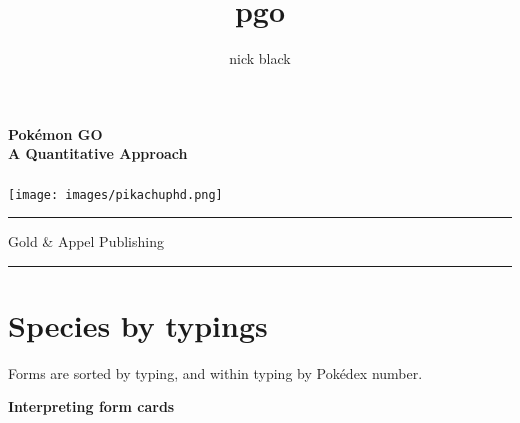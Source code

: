 \documentclass[ebook,10pt,openany,oneside]{memoir}
\title{pgo}
\author{nick black}
\def\LOGO {
  \textbf{
    \Huge Pokémon GO\\
    \Large A Quantitative Approach\\
  }}
\begin{document}
  \pagestyle{empty}
  \begin{center}
  \LOGO
  \bigskip
  \\
  \vspace{3cm}
  \texttt{[image: images/pikachuphd.png]}
  \end{center}
  \vfill\hrule
  \begin{center}\textsf{Gold \& Appel Publishing}\end{center}
  \hrule
  \clearpage
  \setcounter{page}{1}
  \pagestyle{plain} %

\clearpage
\ifdefined\epub
\else
  \hypertarget{toc}{}%
  \tableofcontents*
  \hypertarget{lot}{}%
  \listoftables*
  \hypertarget{lof}{}%
  \listoffigures*
  \fi

\mainmatter















\appendix

\chapter{Species by typings\label{chap:speciesbytype}}
Forms are sorted by typing, and within typing by Pokédex number.
\vfill
\begin{center}\textbf{Interpreting form cards}\end{center}
\end{document}
